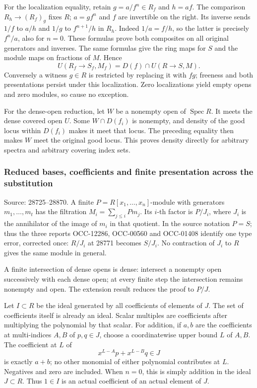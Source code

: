 For the localization equality, retain \(g=a/f^n\in R_f\) and \(h=af\). The comparison \(R_h\to(R_f)_g\) fixes \(R\); \(a=g f^n\) and \(f\) are invertible on the right. Its inverse sends \(1/f\) to \(a/h\) and \(1/g\) to \(f^{n+1}/h\) in \(R_h\). Indeed \(1/a=f/h\), so the latter is precisely \(f^n/a\), also for \(n=0\). These formulas prove both composites on all original generators and inverses. The same formulas give the ring maps for \(S\) and the module maps on fractions of \(M\). Hence \[
 U(R_f\to S_f,M_f)=D(f)\cap U(R\to S,M).
\] Conversely a witness \(g\in R\) is restricted by replacing it with \(fg\); freeness and both presentations persist under this localization. Zero localizations yield empty opens and zero modules, so cause no exception.

For the dense-open reduction, let \(W\) be a nonempty open of \(\operatorname{Spec}R\). It meets the dense covered open \(U\). Some \(W\cap D(f_i)\) is nonempty, and density of the good locus within \(D(f_i)\) makes it meet that locus. The preceding equality then makes \(W\) meet the original good locus. This proves density directly for arbitrary spectra and arbitrary covering index sets.

\subsubsection{Reduced bases, coefficients and finite presentation across the substitution}\label{algebra-proof-027-reduced-bases-coefficients-and-finite-presentation-across-the-substitution}

Source: 28725--28870. A finite \(P=R[x_1,\ldots,x_n]\)-module with generators \(m_1,\ldots,m_t\) has the filtration \(M_i=\sum_{j\le i}Pm_j\). Its \(i\)-th factor is \(P/J_i\), where \(J_i\) is the annihilator of the image of \(m_i\) in that quotient. In the source notation \(P=S\); thus the three reports OCC-12286, OCC-00560 and OCC-01408 identify one type error, corrected once: \(R/J_i\) at 28771 becomes \(S/J_i\). No contraction of \(J_i\) to \(R\) gives the same module in general.

A finite intersection of dense opens is dense: intersect a nonempty open successively with each dense open; at every finite step the intersection remains nonempty and open. The extension result reduces the proof to \(P/J\).

Let \(I\subset R\) be the ideal generated by all coefficients of elements of \(J\). The set of coefficients itself is already an ideal. Scalar multiples are coefficients after multiplying the polynomial by that scalar. For addition, if \(a,b\) are the coefficients at multi-indices \(A,B\) of \(p,q\in J\), choose a coordinatewise upper bound \(L\) of \(A,B\). The coefficient at \(L\) of \[
 x^{L-A}p+x^{L-B}q\in J
\] is exactly \(a+b\); no other monomial of either polynomial contributes at \(L\). Negatives and zero are included. When \(n=0\), this is simply addition in the ideal \(J\subset R\). Thus \(1\in I\) is an actual coefficient of an actual element of \(J\).

